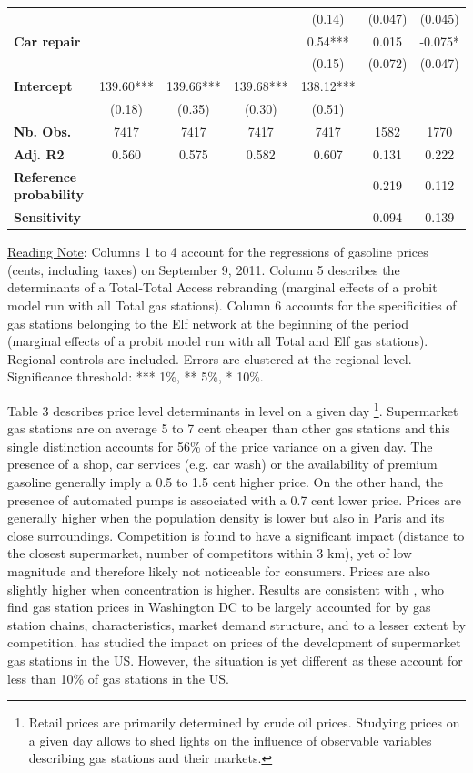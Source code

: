 \documentclass[english]{article}
\begin{document}
\begin{table}
\begin{threeparttable}
\begin{footnotesize}
\begin{tabular}{l|cccccc}
 &  &  &  & (0.14)  & (0.047)  & (0.045)\tabularnewline
\textbf{Car repair}  &  &  &  & 0.54{*}{*}{*}  & 0.015  & -0.075{*}\tabularnewline
 &  &  &  & (0.15)  & (0.072)  & (0.047)\tabularnewline
\hline
\textbf{Intercept}  & 139.60{*}{*}{*}  & 139.66{*}{*}{*}  & 139.68{*}{*}{*}  & 138.12{*}{*}{*}  &  & \tabularnewline
 & (0.18)  & (0.35)  & (0.30)  & (0.51)  &  & \tabularnewline
\hline
\textbf{Nb. Obs.}  & 7417  & 7417  & 7417  & 7417  & 1582  & 1770\tabularnewline
\textbf{Adj. R2}  & 0.560  & 0.575  & 0.582  & 0.607  & 0.131  & 0.222\tabularnewline
\textbf{Reference probability}  &  &  &  &  & 0.219  & 0.112\tabularnewline
\textbf{Sensitivity}  &  &  &  &  & 0.094  & 0.139\tabularnewline
\hline
\hline
\end{tabular}
\end{footnotesize}
\end{threeparttable}
\parbox{\textwidth}{\footnotesize%
\vspace{2eX} %
{\footnotesize{}\uline{Reading Note}}{\footnotesize{}: } Columns 1 to 4 account for the regressions of gasoline prices (cents, including taxes) on September 9, 2011. Column 5 describes the determinants of a Total-Total Access rebranding (marginal effects of a probit model run with all Total gas stations). Column 6 accounts for the specificities of gas stations belonging to the Elf network at the beginning of the period (marginal effects of a probit model run with all Total and Elf gas stations). Regional controls are included. Errors are clustered at the regional level. Significance threshold: {*}{*}{*} 1\%, {*}{*} 5\%, {*} 10\%.}
\end{table}

Table 3 describes price level determinants in level on a given day%
\footnote{Retail prices are primarily determined by crude oil prices. Studying prices on a given day allows to shed lights on the influence of observable variables describing gas stations and their markets.%
}. Supermarket gas stations are on average 5 to 7 cent cheaper than other gas stations and this single distinction accounts for 56\% of the price variance on a given day. The presence of a shop, car services (e.g. car wash) or the availability of premium gasoline generally imply a 0.5 to 1.5 cent higher price. On the other hand, the presence of automated pumps is associated with a 0.7 cent lower price. Prices are generally higher when the population density is lower but also in Paris and its close surroundings. Competition is found to have a significant impact (distance to the closest supermarket, number of competitors within 3 km), yet of low magnitude and therefore likely not noticeable for consumers. Prices are also slightly higher when concentration is higher. Results are consistent with \cite{HOS08}, who find gas station prices in Washington DC to be largely accounted for by gas station chains, characteristics, market demand structure, and to a lesser extent by competition. \cite{ZIM12} has studied the impact on prices of the development of supermarket gas stations in the US. However, the situation is yet different as these account for less than 10\% of gas stations in the US. 
\end{document}
